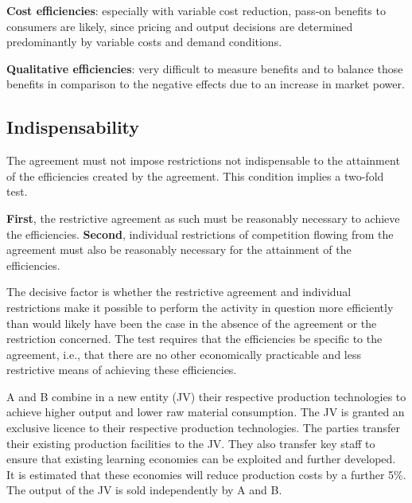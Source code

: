         \textbf{Cost efficiencies}: especially with variable cost reduction, pass-on benefits to consumers are likely, since pricing and output decisions are determined predominantly by variable costs and demand conditions.
        
        \textbf{Qualitative efficiencies}: very difficult to measure benefits and to balance those benefits in comparison to the negative effects due to an increase in market power. 


    \subsection{Indispensability}

        The agreement must not impose restrictions not indispensable to the attainment of the efficiencies created by the agreement. This condition implies a two-fold test.

        \textbf{First}, the restrictive agreement as such must be reasonably necessary to achieve the efficiencies.  
        \textbf{Second}, individual restrictions of competition flowing from the agreement must also be reasonably necessary for the attainment of the efficiencies.
        
        The decisive factor is whether the restrictive agreement and individual restrictions make it possible to perform the activity in question more efficiently than would likely have been the case in the absence of the agreement or the restriction concerned. The test requires that the efficiencies be specific to the agreement, i.e., that there are no other economically practicable and less restrictive means of achieving these efficiencies.
        
        A and B combine in a new entity (JV) their respective production technologies to achieve higher output and lower raw material consumption. The JV is granted an exclusive licence to their respective production technologies. The parties transfer their existing production facilities to the JV. They also transfer key staff to ensure that existing learning economies can be exploited and further developed. It is estimated that these economies will reduce production costs by a further 5\%. The output of the JV is sold independently by A and B.
        

